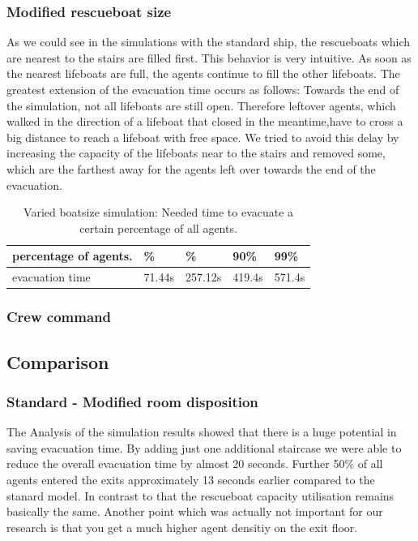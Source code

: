 \documentclass[11pt]{article}
\begin{document}
\subsubsection{Modified rescueboat size}
As we could see in the simulations with the standard ship, the rescueboats which are nearest to the stairs are filled first. This behavior is very intuitive. As soon as the nearest lifeboats are full, the agents continue to fill the other lifeboats. 
The greatest extension of the evacuation time occurs as follows:
Towards the end of the simulation, not all lifeboats are still open. Therefore leftover agents, which walked in the direction of a lifeboat that closed in the meantime,have to cross a big distance to reach a lifeboat with free space.\newline
We tried to avoid this delay by increasing the capacity of the lifeboats near to the stairs and removed some, which are the farthest away for the agents left over towards the end of the evacuation.



\begin{table}[h]
\centering
\begin{tabular}
{|>{\large}m{2cm} |>{\center}b{1.1cm} |>{\center}b{1.1cm}|>{}b{1.1cm}|>{}b{1.1cm}|} \hline \hline
percentage of agents.& 10\% &  50\% & 90\% & 99\% \\ \hline
evacuation time & 71.44s &257.12s & 419.4s & 571.4s \\ \hline \hline
\end{tabular}
\caption{Varied boatsize simulation: Needed time to evacuate a certain percentage of all agents.}
\end{table}






\subsubsection{Crew command}
\subsection{Comparison}
\subsubsection{Standard - Modified room disposition}
The Analysis of the simulation results showed that there is a huge potential in saving evacuation time. By adding just one additional staircase we were able to reduce the overall evacuation time by almost 20 seconds. Further 50\% of all agents entered the exits approximately 13 seconds earlier compared to the stanard model. In contrast to that the rescueboat capacity utilisation remains basically the same. Another point which was actually not important for our research is that you get a much higher agent densitiy on the exit floor. 
\end{document}
